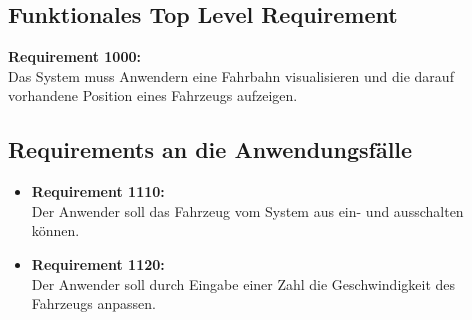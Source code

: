 \subsection*{Funktionales Top Level Requirement}
\textbf{Requirement 1000:}\\
Das System muss Anwendern eine Fahrbahn visualisieren und die darauf vorhandene Position eines Fahrzeugs aufzeigen.
\subsection*{Requirements an die Anwendungsf\"alle}
\begin{itemize}
\item \textbf{Requirement 1110:}\\
Der Anwender soll das Fahrzeug vom System aus ein- und ausschalten k\"onnen.
\item \textbf{Requirement 1120:}\\
Der Anwender soll durch Eingabe einer Zahl die Geschwindigkeit des Fahrzeugs anpassen.\\
\end{itemize}